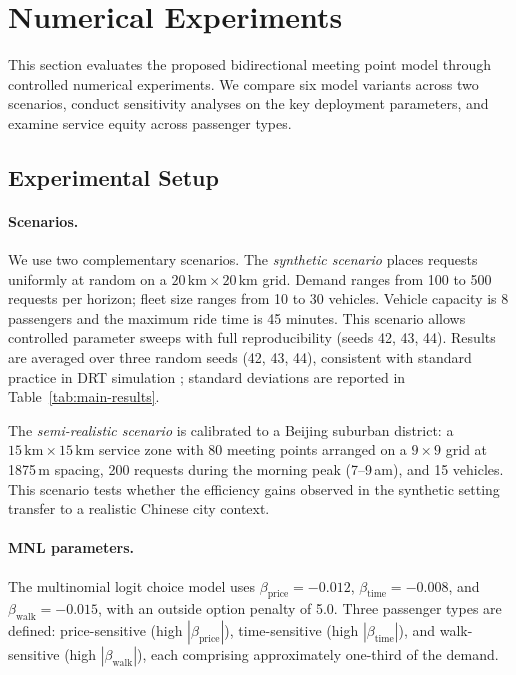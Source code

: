 \section{Numerical Experiments}\label{sec:experiments}

This section evaluates the proposed bidirectional meeting point model through
controlled numerical experiments. We compare six model variants across two
scenarios, conduct sensitivity analyses on the key deployment parameters, and
examine service equity across passenger types.

\subsection{Experimental Setup}

\paragraph{Scenarios.}
We use two complementary scenarios. The \emph{synthetic scenario} places
requests uniformly at random on a $20\,\text{km} \times 20\,\text{km}$ grid.
Demand ranges from 100 to 500 requests per horizon; fleet size ranges from 10
to 30 vehicles. Vehicle capacity is 8 passengers and the maximum ride time is
45 minutes. This scenario allows controlled parameter sweeps with full
reproducibility (seeds 42, 43, 44). Results are averaged over three random seeds (42, 43, 44), consistent with standard practice in DRT simulation \citep{wu2025}; standard deviations
are reported in Table~\ref{tab:main-results}.

The \emph{semi-realistic scenario} is calibrated to a Beijing suburban
district: a $15\,\text{km} \times 15\,\text{km}$ service zone with 80 meeting
points arranged on a $9 \times 9$ grid at 1875\,m spacing, 200 requests
during the morning peak (7--9\,am), and 15 vehicles. This scenario tests
whether the efficiency gains observed in the synthetic setting transfer to a
realistic Chinese city context.

\paragraph{MNL parameters.}
The multinomial logit choice model uses $\beta_{\text{price}} = -0.012$,
$\beta_{\text{time}} = -0.008$, and $\beta_{\text{walk}} = -0.015$, with an
outside option penalty of 5.0. Three passenger types are defined: price-sensitive
(high $|\beta_{\text{price}}|$), time-sensitive (high $|\beta_{\text{time}}|$),
and walk-sensitive (high $|\beta_{\text{walk}}|$), each comprising approximately
one-third of the demand.

